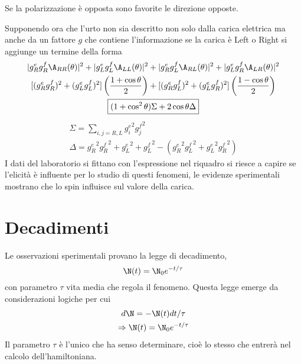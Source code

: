 \documentclass[12pt]{book}
\begin{document}
Se la polarizzazione è opposta sono favorite le direzione opposte.

Supponendo ora che l'urto non sia descritto non solo dalla carica elettrica ma anche da un fattore $g$ che contiene l'informazione se la carica è Left o Right si aggiunge un termine della forma
\begin{gather}
	|g_R^e g_R^f \A_{RR}(\theta) |^2 + |g_L^e g_L^f \A_{LL}(\theta)|^2 +|g_R^e g_L^f \A_{RL}(\theta) |^2 + |g_L^e g_R^f \A_{LR}(\theta)|^2\\
	[( g_R^e g_R^f)^2+ (g_L^e g_L^f )^2 ] \left( \frac{1+\cos \theta}{2} \right) + [(g_R^e g_L^f)^2+ (g_L^e g_R^f)^2] \left(\frac{1-\cos \theta}{2} \right)\\
	\boxed{(1+ \cos^2 \theta) \Sigma + 2 \cos \theta \Delta }
\end{gather}
\begin{gather}
			\Sigma = \sum_{i,j=R,L} {g_i^e}^2{g_j^f}^2\\
		\Delta = {g_R^e}^2 {g_R^f}^2 + {g_L^e}^2 +{g_L^f}^2 - ( {g_R^e}^2 {g_L^f}^2 + {g_L^e}^2 {g_R^f}^2)
\end{gather}
I dati del laboratorio si fittano con l'espressione nel riquadro si riesce a capire se l'elicità è influente per lo studio di questi fenomeni, le evidenze sperimentali mostrano che lo spin influisce sul valore della carica.

\newpage
\section{Decadimenti}
Le osservazioni sperimentali provano la legge di decadimento, 
\begin{equation}
	\N (t) = \N_0 e^{-t/\tau}
\end{equation}
con parametro $\tau$ vita media che regola il fenomeno. Questa legge emerge da considerazioni logiche per cui 
\begin{gather}
	d \N = - \N(t) dt / \tau\\
	\Rightarrow \N(t) = \N_0 e^{-t/\tau}
\end{gather}
Il parametro $\tau$ è l'unico che ha senso determinare, cioè lo stesso che entrerà nel calcolo dell'hamiltoniana. 
\end{document}
